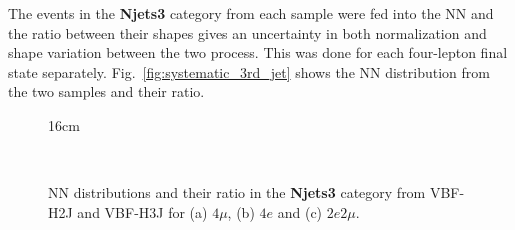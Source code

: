 The events in the \textbf{Njets3} category from each sample were fed into the NN and the ratio between their shapes gives an uncertainty in both normalization and shape variation between the two process. This was done for each four-lepton final state separately. Fig.~\ref{fig:systematic_3rd_jet} shows the NN distribution from the two samples and their ratio.

\begin{figure}[hbtp]{16cm}
	\caption{NN distributions and their ratio in the \textbf{Njets3} category from VBF-H2J and VBF-H3J for (a) $4\mu$, (b) $4e$ and (c) $2e2\mu$.}
	\centering
	\\

\end{figure}

